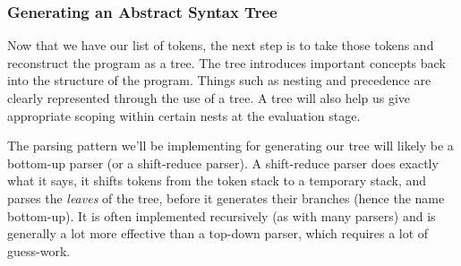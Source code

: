 \documentclass{article}
\begin{document}
    \subsubsection{Generating an Abstract Syntax Tree}
      Now that we have our list of tokens, the next step is to take those tokens
      and reconstruct the program as a tree.  The tree introduces important
      concepts back into the structure of the program.  Things such as nesting
      and precedence are clearly represented through the use of a tree.  A tree
      will also help us give appropriate scoping within certain nests at the
      evaluation stage.

      The parsing pattern we'll be implementing for generating our tree will
      likely be a bottom-up parser (or a shift-reduce parser). A shift-reduce
      parser does exactly what it says, it shifts tokens from the token stack
      to a temporary stack, and parses the \emph{leaves} of the tree, before it
      generates their branches (hence the name bottom-up).  It is often
      implemented recursively (as with many parsers) and is generally a lot more
      effective than a top-down parser, which requires a lot of guess-work.
\end{document}
